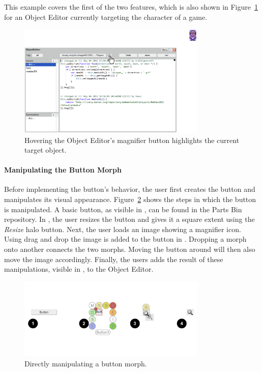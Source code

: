This example covers the first of the two features, which is also shown in Figure~\ref{fig:MagnifierBehavior} for an Object Editor currently targeting the character of a game.

\begin{figure}[h]
    \centering
    \includegraphics[width=0.8\textwidth]{figures/3_motivation/2_magnifierBehavior.png}
    \caption{Hovering the Object Editor's magnifier button highlights the current target object.}
    \label{fig:MagnifierBehavior}
\end{figure}

\paragraph{Manipulating the Button Morph}
Before implementing the button's behavior, the user first creates the button and manipulates its visual appearance.
Figure~\ref{fig:ButtonBuilding} shows the steps in which the button is manipulated.
A basic button, as visible in , can be found in the Parts Bin repository.
In , the user resizes the button and gives it a square extent using the \emph{Resize} halo button.
Next, the user loads an image showing a magnifier icon.
Using drag and drop the image is added to the button in .
Dropping a morph onto another connects the two morphs.
Moving the button around will then also move the image accordingly.
Finally, the users adds the result of these manipulations, visible in , to the Object Editor.

\begin{figure}[h]
    \centering
    \includegraphics[width=0.8\textwidth]{figures/3_motivation/3_buildingTheButton.pdf}
    \caption{Directly manipulating a button morph.}
    \label{fig:ButtonBuilding}
\end{figure}


